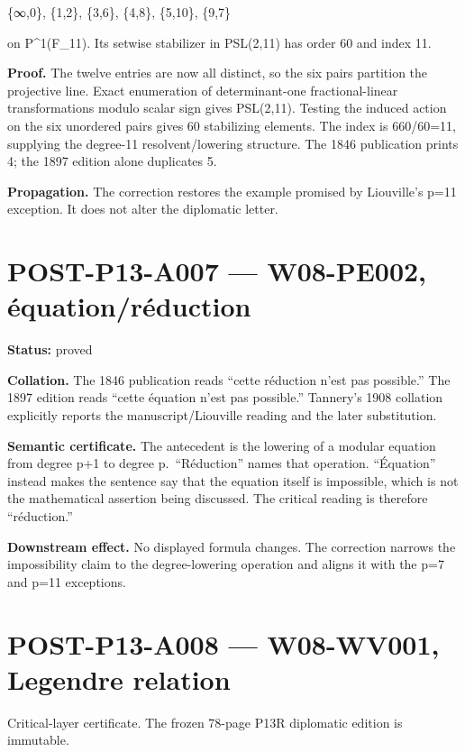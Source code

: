 \documentclass[
  10pt,
  a4paper,
]{scrreprt}
\begin{document}
\{∞,0\}, \{1,2\}, \{3,6\}, \{4,8\}, \{5,10\}, \{9,7\}

on P\^{}1(F\_11). Its setwise stabilizer in PSL(2,11) has order 60 and
index 11.

\textbf{Proof.} The twelve entries are now all distinct, so the six
pairs partition the projective line. Exact enumeration of
determinant-one fractional-linear transformations modulo scalar sign
gives \textbar PSL(2,11). Testing the induced action on the
six unordered pairs gives 60 stabilizing elements. The index is
660/60=11, supplying the degree-11 resolvent/lowering structure. The
1846 publication prints 4; the 1897 edition alone duplicates 5.

\textbf{Propagation.} The correction restores the example promised by
Liouville's p=11 exception. It does not alter the diplomatic letter.

\section{POST-P13-A007 --- W08-PE002,
équation/réduction}\label{post-p13-a007-w08-pe002-uxe9quationruxe9duction}

\textbf{Status:} proved

\textbf{Collation.} The 1846 publication reads ``cette réduction n'est
pas possible.'' The 1897 edition reads ``cette équation n'est pas
possible.'' Tannery's 1908 collation explicitly reports the
manuscript/Liouville reading and the later substitution.

\textbf{Semantic certificate.} The antecedent is the lowering of a
modular equation from degree p+1 to degree p.~``Réduction'' names that
operation. ``Équation'' instead makes the sentence say that the equation
itself is impossible, which is not the mathematical assertion being
discussed. The critical reading is therefore ``réduction.''

\textbf{Downstream effect.} No displayed formula changes. The correction
narrows the impossibility claim to the degree-lowering operation and
aligns it with the p=7 and p=11 exceptions.

\section{POST-P13-A008 --- W08-WV001, Legendre
relation}\label{post-p13-a008-w08-wv001-legendre-relation}

Critical-layer certificate. The frozen 78-page P13R diplomatic edition
is immutable.
\end{document}
